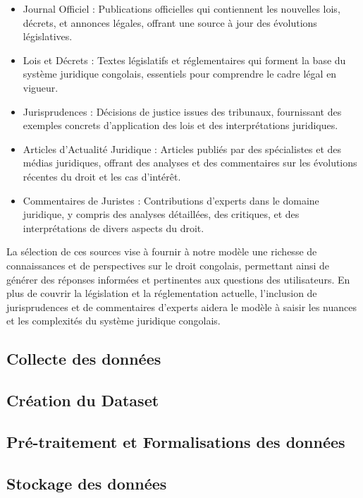 \begin{itemize}
    \item Journal Officiel : Publications officielles qui contiennent les nouvelles lois, décrets, et annonces légales, offrant une source à jour des évolutions législatives.
    
    \item Lois et Décrets : Textes législatifs et réglementaires qui forment la base du système juridique congolais, essentiels pour comprendre le cadre légal en vigueur.
    
    \item Jurisprudences : Décisions de justice issues des tribunaux, fournissant des exemples concrets d'application des lois et des interprétations juridiques.
    
    \item Articles d'Actualité Juridique : Articles publiés par des spécialistes et des médias juridiques, offrant des analyses et des commentaires sur les évolutions récentes du droit et les cas d'intérêt.
    
    \item Commentaires de Juristes : Contributions d'experts dans le domaine juridique, y compris des analyses détaillées, des critiques, et des interprétations de divers aspects du droit.
\end{itemize}

La sélection de ces sources vise à fournir à notre modèle une richesse de connaissances et de perspectives sur le droit congolais, permettant ainsi de générer des réponses informées et pertinentes aux questions des utilisateurs. En plus de couvrir la législation et la réglementation actuelle, l'inclusion de jurisprudences et de commentaires d'experts aidera le modèle à saisir les nuances et les complexités du système juridique congolais.

\subsection{Collecte des données}
\subsection{Création du Dataset}
\subsection{Pré-traitement et Formalisations des données}
\subsection{Stockage des données}

